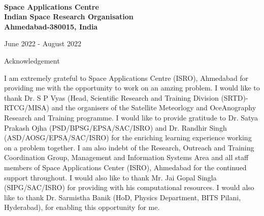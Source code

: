 \documentclass[a4paper,12pt,twoside]{article}
\begin{document}
\begin{center}
\\
\begin{large}
\textbf{Space Applications Centre\\
Indian Space Research Organisation\\
Ahmedabad-380015, India}\\
\end{large}
June 2022 - August 2022
\end{center}

\newpage
\begin{center}
\begin{LARGE}
Acknowledgement \\	
\end{LARGE}
\begin{center}
\justifying 
\noindent I am extremely grateful to Space Applications Centre (ISRO), Ahmedabad for providing me with the opportunity to work on an amzing problem. I would like to thank Dr. S P Vyas (Head, Scientific Research and Training Division (SRTD)-RTCG/MISA) and the organisers of the Satellite Meteorlogy and OceAnography Research and Training  programme. I would like to provide gratitude to Dr. Satya Prakash Ojha (PSD/BPSG/EPSA/SAC/ISRO) and Dr. Randhir Singh (ASD/AOSG/EPSA/SAC/ISRO) for the enriching learning experience working on a problem together. I am also indebt of the Research, Outreach and Training Coordination Group, Management and Information Systems Area  and all staff members of Space Applications Center (ISRO), Ahmedabad for the continued support throughout. I would also like to thank Mr. Jai Gopal Singla (SIPG/SAC/ISRO) for providing with his computational resources. I would also like to thank Dr. Sarmistha Banik (HoD, Physics Department, BITS Pilani, Hyderabad), for enabling this opportunity for me. \\
\end{center}
\end{center}
\end{document}

